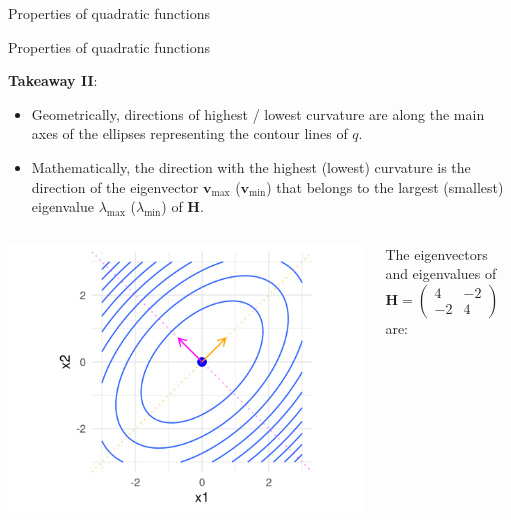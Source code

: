 \begin{frame}{Properties of quadratic functions}
{  }
  
  \end{frame}
  
  
  \begin{frame}{Properties of quadratic functions}
  
  \textbf{Takeaway II}:
  
  \begin{itemize}
    \item Geometrically, directions of highest / lowest curvature are along the main axes of the ellipses representing the contour lines of $q$. 
    \item Mathematically, the direction with the highest (lowest) curvature is the direction of the eigenvector $\bm{v}_\text{max}$ ($\bm{v}_\text{min}$) that belongs to the largest (smallest) eigenvalue $\lambda_\text{max}$ ($\lambda_\text{min}$) of $\bm{H}$. 
  \end{itemize}
  
  \begin{columns}
  
  \begin{column}{0.5\textwidth}  
      \begin{center}
        \includegraphics{figure_man/quadratic_functions_2D_example_1_7.png}      
       \end{center}
  \end{column}
  
  \begin{column}{0.5\textwidth}
  
  \begin{footnotesize}
   The eigenvectors and eigenvalues of $\bm{H} = \begin{pmatrix} 4 & -2 \\ -2 & 4\end{pmatrix}$ are: 
  

\end{footnotesize}
\end{column}
\end{columns}
\end{frame}
